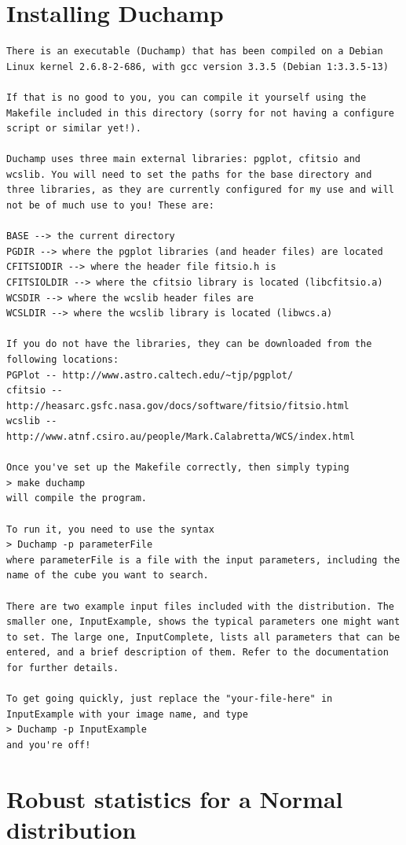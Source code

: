 \documentclass[12pt,a4paper]{article}
\begin{document}
\section{Installing Duchamp}
\begin{verbatim}
There is an executable (Duchamp) that has been compiled on a Debian
Linux kernel 2.6.8-2-686, with gcc version 3.3.5 (Debian 1:3.3.5-13)

If that is no good to you, you can compile it yourself using the
Makefile included in this directory (sorry for not having a configure
script or similar yet!).

Duchamp uses three main external libraries: pgplot, cfitsio and
wcslib. You will need to set the paths for the base directory and
three libraries, as they are currently configured for my use and will
not be of much use to you! These are:

BASE --> the current directory
PGDIR --> where the pgplot libraries (and header files) are located
CFITSIODIR --> where the header file fitsio.h is
CFITSIOLDIR --> where the cfitsio library is located (libcfitsio.a)
WCSDIR --> where the wcslib header files are
WCSLDIR --> where the wcslib library is located (libwcs.a)

If you do not have the libraries, they can be downloaded from the
following locations: 
PGPlot -- http://www.astro.caltech.edu/~tjp/pgplot/
cfitsio -- http://heasarc.gsfc.nasa.gov/docs/software/fitsio/fitsio.html
wcslib -- http://www.atnf.csiro.au/people/Mark.Calabretta/WCS/index.html

Once you've set up the Makefile correctly, then simply typing
> make duchamp
will compile the program.

To run it, you need to use the syntax
> Duchamp -p parameterFile
where parameterFile is a file with the input parameters, including the
name of the cube you want to search.

There are two example input files included with the distribution. The
smaller one, InputExample, shows the typical parameters one might want
to set. The large one, InputComplete, lists all parameters that can be
entered, and a brief description of them. Refer to the documentation
for further details.

To get going quickly, just replace the "your-file-here" in
InputExample with your image name, and type
> Duchamp -p InputExample
and you're off!
\end{verbatim}

\section{Robust statistics for a Normal distribution}
\label{app-madfm}
\end{document}
